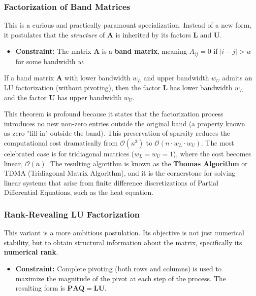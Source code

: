 \subsubsection{Factorization of Band Matrices}
This is a curious and practically paramount specialization. Instead of a new form, it postulates that the \textit{structure} of $\mathbf{A}$ is inherited by its factors $\mathbf{L}$ and $\mathbf{U}$.

\begin{itemize}
    \item \textbf{Constraint:} The matrix $\mathbf{A}$ is a \textbf{band matrix}, meaning $A_{ij} = 0$ if $|i-j| > w$ for some bandwidth $w$.
\end{itemize}

\begin{theorem}
If a band matrix $\mathbf{A}$ with lower bandwidth $w_L$ and upper bandwidth $w_U$ admits an LU factorization (without pivoting), then the factor $\mathbf{L}$ has lower bandwidth $w_L$ and the factor $\mathbf{U}$ has upper bandwidth $w_U$.
\end{theorem}

\begin{remark}
This theorem is profound because it states that the factorization process introduces no new non-zero entries outside the original band (a property known as zero "fill-in" outside the band). This preservation of sparsity reduces the computational cost dramatically from $\mathcal{O}(n^3)$ to $\mathcal{O}(n \cdot w_L \cdot w_U)$. The most celebrated case is for tridiagonal matrices ($w_L=w_U=1$), where the cost becomes linear, $\mathcal{O}(n)$. The resulting algorithm is known as the \textbf{Thomas Algorithm} or TDMA (Tridiagonal Matrix Algorithm), and it is the cornerstone for solving linear systems that arise from finite difference discretizations of Partial Differential Equations, such as the heat equation.
\end{remark}

\subsubsection{Rank-Revealing LU Factorization}
This variant is a more ambitious postulation. Its objective is not just numerical stability, but to obtain structural information about the matrix, specifically its \textbf{numerical rank}.

\begin{itemize}
    \item \textbf{Constraint:} Complete pivoting (both rows and columns) is used to maximize the magnitude of the pivot at each step of the process. The resulting form is $\mathbf{P}\mathbf{A}\mathbf{Q} = \mathbf{L}\mathbf{U}$.
\end{itemize}

